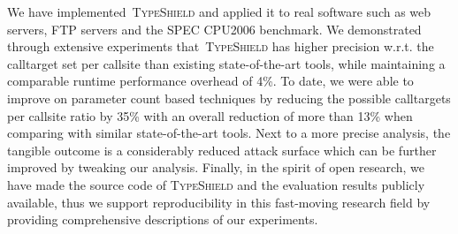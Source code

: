 We have implemented~\textsc{TypeShield} and applied it to real software such as web servers, FTP servers and the SPEC CPU2006 benchmark. 
We demonstrated through extensive experiments that~\textsc{TypeShield} has 
higher precision w.r.t. the calltarget set per callsite than existing state-of-the-art tools, while maintaining a comparable runtime performance overhead of 4\%. 
To date, we were able to improve on parameter count based techniques by reducing the possible calltargets per 
callsite ratio by 35\% with an overall reduction of more than 13\% when comparing with similar state-of-the-art tools. 
Next to a more precise analysis, the tangible outcome is a considerably reduced attack surface which can be further improved by 
tweaking our analysis. Finally, in the spirit of open research, we have made the source code of \textsc{TypeShield} and the evaluation results publicly available, 
thus we support reproducibility in this fast-moving research field by providing comprehensive descriptions of our experiments.


